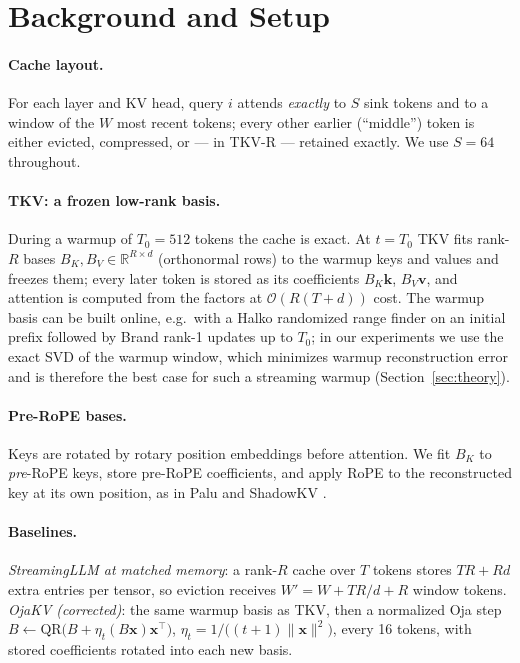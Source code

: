 \documentclass{article}
\newcommand{\R}{\mathbb{R}}
\begin{document}
\section{Background and Setup}
\label{sec:setup}

\paragraph{Cache layout.}
For each layer and KV head, query $i$ attends \emph{exactly} to $S$ sink tokens
and to a window of the $W$ most recent tokens; every other earlier (``middle'')
token is either evicted, compressed, or --- in TKV-R --- retained exactly. We
use $S{=}64$ throughout.

\paragraph{TKV: a frozen low-rank basis.}
During a warmup of $T_0{=}512$ tokens the cache is exact. At $t = T_0$ TKV fits
rank-$R$ bases $B_K, B_V \in \R^{R\times d}$ (orthonormal rows) to the warmup
keys and values and freezes them; every later token is stored as its
coefficients $B_K\mathbf{k}$, $B_V\mathbf{v}$, and attention is computed from the
factors at $\mathcal{O}(R(T{+}d))$ cost. The warmup basis can be built online,
e.g.\ with a Halko randomized range finder \citep{halko2011} on an initial
prefix followed by Brand rank-1 updates \citep{brand2006} up to $T_0$; in our
experiments we use the exact SVD of the warmup window, which minimizes warmup
reconstruction error and is therefore the best case for such a streaming
warmup (Section~\ref{sec:theory}).

\paragraph{Pre-RoPE bases.}
Keys are rotated by rotary position embeddings \citep{rope2021} before
attention. We fit $B_K$ to \emph{pre}-RoPE keys, store pre-RoPE coefficients,
and apply RoPE to the reconstructed key at its own position, as in Palu
\citep{palu2024} and ShadowKV \citep{shadowkv2024}.

\paragraph{Baselines.}
\emph{StreamingLLM at matched memory}: a rank-$R$ cache over $T$ tokens stores
$TR + Rd$ extra entries per tensor, so eviction receives $W' = W + TR/d + R$
window tokens. \emph{OjaKV (corrected)}: the same warmup basis as TKV, then a
normalized Oja step \citep{oja1982}
$B \leftarrow \mathrm{QR}\bigl(B + \eta_t (B\mathbf{x})\mathbf{x}^\top\bigr)$,
$\eta_t = 1/\bigl((t{+}1)\lVert\mathbf{x}\rVert^2\bigr)$, every 16 tokens, with
stored coefficients rotated into each new basis.
\end{document}
